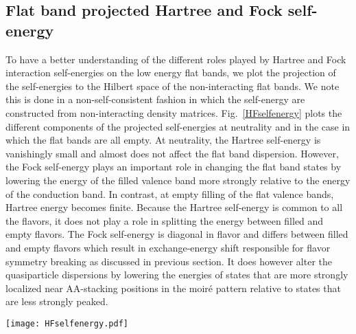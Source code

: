 \documentclass[aps,prl,reprint,amssymb,groupedaddress,twocolumn]{revtex4}
\begin{document}
\subsection{Flat band projected Hartree and Fock self-energy}

To have a better understanding of the different roles played by Hartree and Fock interaction self-energies 
on the low energy flat bands, we plot the projection of the self-energies to the Hilbert space of the non-interacting flat bands.
We note this is done in a non-self-consistent fashion in which the self-energy are constructed from non-interacting 
density matrices. 
Fig.~\ref{HFselfenergy} plots the different components of the projected self-energies at neutrality and in the case 
in which the flat bands are all empty. 
At neutrality, the Hartree self-energy is vanishingly small and almost does not affect the flat band dispersion.
However, the Fock self-energy plays an important role in changing the flat band states by lowering the energy of the filled
valence band more strongly relative to the energy of the conduction band.  
In contrast, at empty filling of the flat valence bands, Hartree energy becomes finite.
Because the Hartree self-energy is common to all the flavors, it does not play a role in splitting 
the energy between filled and empty flavors.
The Fock self-energy is diagonal in flavor and differs between filled and empty flavors which result in exchange-energy shift responsible for flavor symmetry
breaking as discussed in previous section.  It does however alter the quasiparticle dispersions by lowering the energies of states that are more strongly
localized near AA-stacking positions in the moir\'e pattern relative to states that are less strongly peaked.  


\begin{figure*}[t]
	\begin{center}
		\centering
		\texttt{[image: HFselfenergy.pdf]}
		\caption{Projection of Hartree and Fock self-energies onto non-interacting flat bands at neutrality (a-d) and at empty flat bands (e-f). 
			$\Sigma^H_{ab}$ and $\Sigma^F_{ab}$ stand for Hartree and Fock self-energies 
			respectively where $(a,b)=(c,v)$ are band indices for flat conduction (c) and valence (v) bands.
			Only the  diagonal components of the projection are plotted and these have vanishing imaginary parts.}
		\label{HFselfenergy}
	\end{center}
\end{figure*}
\end{document}
